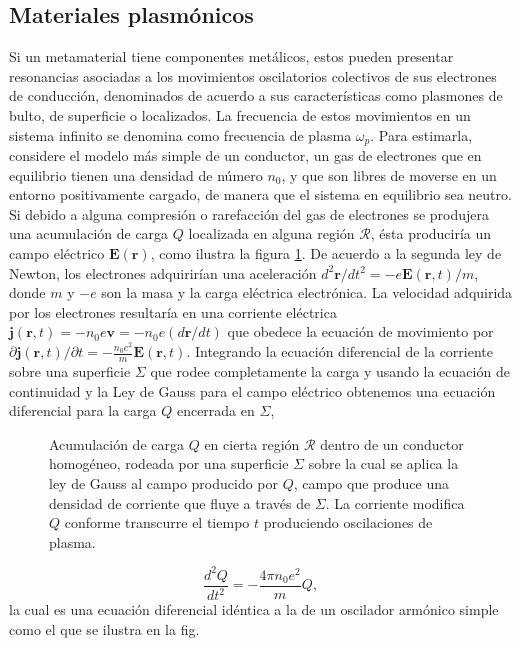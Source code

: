 \documentclass[12pt]{article}
\begin{document}
\subsection{Materiales plasmónicos}
Si un metamaterial tiene componentes metálicos, estos
pueden presentar resonancias asociadas a los movimientos oscilatorios
colectivos de sus electrones de conducción, denominados de acuerdo a sus
características como plasmones de bulto, de superficie o
localizados. La frecuencia de estos movimientos en un sistema infinito se
denomina como
frecuencia de plasma $\omega_{p}$. Para estimarla,
considere el modelo más simple de un conductor, un gas de electrones
que en equilibrio tienen una densidad de número $n_{0}$, y que son libres de
moverse en un entorno positivamente cargado, de manera que el sistema
en equilibrio sea neutro. Si debido a alguna compresión o rarefacción
del gas de electrones se produjera una acumulación de carga $Q$
localizada en alguna región $\mathcal{R}$, ésta produciría un campo
eléctrico $\bm{E} (\bm{r})$, como ilustra la figura
\ref{Bulkplasmon}. De acuerdo a la segunda ley de Newton, los
electrones adquirirían una aceleración
$d^{2}\bm{r}/dt^{2} = -e\bm{E}(\bm{r},t)/m$, donde $m$ y $-e$
son la masa y la carga eléctrica electrónica. La velocidad adquirida
por los electrones resultaría en una corriente eléctrica
$\bm{j}(\bm{r},t) = -n_0 e \bm v=-n_{0}e({d\bm{r}}/{dt})$ que obedece
la ecuación de movimiento por
${\partial \bm{j}(\bm{r},t)}/{\partial t}=
-\frac{n_{0}e^{2}}{m}\bm{E}(\bm{r},t)$. Integrando la ecuación
diferencial de la corriente sobre una superficie $\Sigma$ que rodee
completamente la carga y usando la ecuación de continuidad y la Ley de
Gauss para el campo eléctrico obtenemos una ecuación diferencial para
la carga $Q$ encerrada en $\Sigma$,
\begin{figure}
\centering

\caption{Acumulación de carga $Q$ en cierta región $\mathcal{R}$
  dentro de un conductor homogéneo, rodeada por una superficie
  $\Sigma$ sobre la cual se aplica la ley de Gauss al campo producido
  por $Q$, campo que produce una densidad de corriente que fluye a
  través de $\Sigma$. La corriente modifica $Q$ conforme transcurre el
  tiempo $t$ produciendo oscilaciones de plasma.}
\label{Bulkplasmon}
\end{figure}
\begin{equation}
  \label{ChargeDifEq}
  \frac{d^{2}Q}{dt^{2}}=-\frac{4\pi n_0 e^{2}}{m}Q,
\end{equation}
la cual es una ecuación diferencial idéntica a la de un oscilador
armónico simple como el que se ilustra en la fig.
\end{document}
